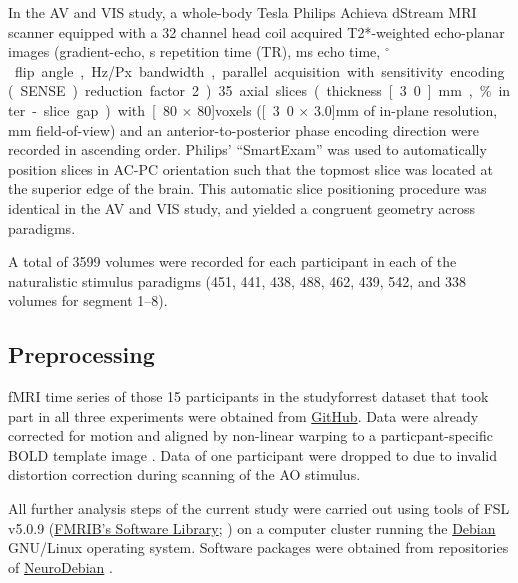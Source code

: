 \documentclass[english]{article}
\begin{document}
In the AV and VIS study, a whole-body \unit[3]{Tesla} Philips Achieva dStream
MRI scanner equipped with a 32 channel head coil acquired T2*-weighted
echo-planar images (gradient-echo, \unit[2]{s} repetition time (TR),
\unit[30]{ms} echo time, \unit[90]{$^{\circ}$} flip angle, \unit[1943]{Hz/Px}
bandwidth, parallel acquisition with sensitivity encoding (SENSE) reduction
factor 2).
35 axial slices (thickness \unit[3.0]{mm}, \unit[10]{\%} inter-slice gap) with
\unit[80 $\times$ 80]{voxels} (\unit[3.0 $\times$ 3.0]{mm} of in-plane
resolution, \unit[240]{mm} field-of-view) and an anterior-to-posterior phase
encoding direction were recorded in ascending order. Philips' ``SmartExam'' was
used to automatically position slices in AC-PC orientation such that the topmost
slice was located at the superior edge of the brain. This automatic slice
positioning procedure was identical in the AV and VIS study, and yielded a
congruent geometry across paradigms.

A total of 3599 volumes were recorded for each participant in each of the
naturalistic stimulus paradigms (451, 441, 438, 488, 462, 439, 542, and 338 volumes for segment 1–8).


\subsection{Preprocessing}


fMRI time series of those 15 participants in the studyforrest dataset that took
part in all three experiments were obtained from
\href{https://github.com/psychoinformatics-de/studyforrest-data-aligned}{GitHub}.
Data were already corrected for motion and aligned by non-linear warping to a
particpant-specific BOLD template image \citep{sengupta2016extension}.
Data of one participant were dropped to due to invalid distortion correction
during scanning of the AO stimulus.

All further analysis steps of the current study were carried out using tools of
FSL v5.0.9 (\href{https://www.fmrib.ox.ac.uk/fsl}{FMRIB's Software
Library}; \citep{smith2004fsl}) on a computer cluster running the
\href{https://www.debian.org}{Debian} GNU/Linux operating system. Software
packages were obtained from repositories of
\href{http://neuro.debian.net}{NeuroDebian} \citep{halchenko2012open}.
\end{document}
